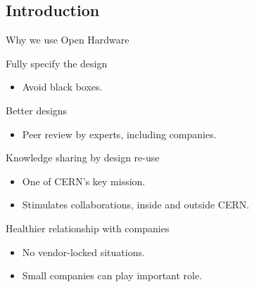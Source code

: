\documentclass[compress,red]{beamer}
\begin{document}
\subsection{Introduction}

\begin{frame}{Why we use Open Hardware}

  \begin{block}{Fully specify the design}
    \begin{itemize}
    \item Avoid black boxes.
    \end{itemize}
  \end{block}

  \begin{block}{Better designs}
    \begin{itemize}
    \item Peer review by experts, including companies.
    \end{itemize}
  \end{block}

  \begin{block}{Knowledge sharing by design re-use}
    \begin{itemize}
    \item One of CERN's key mission.
    \item Stimulates collaborations, inside and outside CERN.
    \end{itemize}
  \end{block}

  \begin{block}{Healthier relationship with companies}
    \begin{itemize}
    \item No vendor-locked situations.
    \item Small companies can play important role.
    \end{itemize}
  \end{block}


\end{frame}
\end{document}
